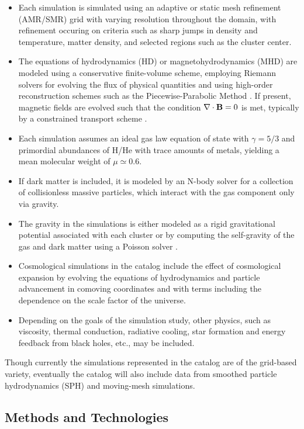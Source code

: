 \documentclass{emulateapj}
\begin{document}
\begin{itemize}
\item Each simulation is simulated using an adaptive or static mesh refinement (AMR/SMR) grid \citep{ber89} with varying resolution throughout the domain, with refinement occuring on criteria such as sharp jumps in density and temperature, matter density, and selected regions such as the cluster center.
\item The equations of hydrodynamics (HD) or magnetohydrodynamics (MHD) are modeled using a conservative finite-volume scheme, employing Riemann solvers for evolving the flux of physical quantities and using high-order reconstruction schemes such as the Piecewise-Parabolic Method \citep[PPM,][]{col84}. If present, magnetic fields are evolved such that the condition $\nabla \cdot {\bf B} = 0$ is met, typically by a constrained transport scheme \citep[CT,][]{eva88}.
\item Each simulation assumes an ideal gas law equation of state with $\gamma = 5/3$ and primordial abundances of H/He with trace amounts of metals, yielding a mean molecular weight of $\mu \simeq 0.6$.
\item If dark matter is included, it is modeled by an N-body solver for a collection of collisionless massive particles, which interact with the gas component only via gravity.
\item The gravity in the simulations is either modeled as a rigid gravitational potential associated with each cluster or by computing the self-gravity of the gas and dark matter using a Poisson solver \citep[e.g.,][]{ric08}.
\item Cosmological simulations in the catalog include the effect of cosmological expansion by evolving the equations of hydrodynamics and particle advancement in comoving coordinates and with terms including the dependence on the scale factor of the universe.
\item Depending on the goals of the simulation study, other physics, such as viscosity, thermal conduction, radiative cooling, star formation and energy feedback from black holes, etc., may be included.
\end{itemize}

Though currently the simulations represented in the catalog are of the grid-based variety, eventually the catalog will also include data from smoothed particle hydrodynamics (SPH) and moving-mesh simulations.

\subsection{Methods and Technologies}\label{sec:methods}
\end{document}
